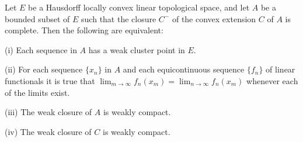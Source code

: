 Let $E$ be a Hausdorff locally convex linear topological space, and let $A$ be a bounded subset of $E$ such that the closure $C^-$ of the convex extension $C$ of $A$ is complete. Then the following are equivalent:

(i) Each sequence in $A$ has a weak cluster point in $E$.

(ii) For each sequence $\{x_n\}$ in $A$ and each equicontinuous sequence $\{f_n\}$ of linear functionals it is true that $\lim_{m \to \infty} f_n(x_m) = \lim_{n \to \infty} f_n(x_m)$ whenever each of the limits exist.

(iii) The weak closure of $A$ is weakly compact.

(iv) The weak closure of $C$ is weakly compact.
